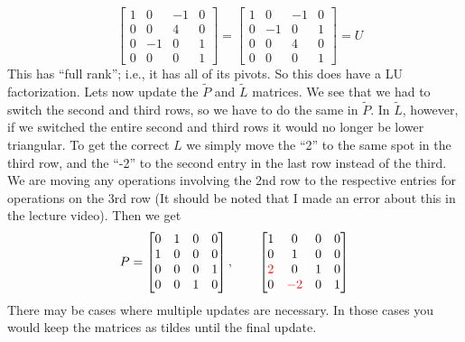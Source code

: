 \documentclass[reqno]{amsart}
\theoremstyle{definition}
\begin{document}
\begin{itemize}
\begin{equation*}
\begin{matrix}
\end{matrix}
\begin{bmatrix}
1 & 0 & -1 & 0\\
0 & 0 & 4 & 0\\
0 & -1 & 0 & 1\\
0 & 0 & 0 & 1
\end{bmatrix} = \begin{bmatrix}
1 & 0 & -1 & 0\\
0 & -1 & 0 & 1\\
0 & 0 & 4 & 0\\
0 & 0 & 0 & 1
\end{bmatrix} = U
\end{equation*}
%
This has ``full rank''; i.e., it has all of its pivots.  So this does have a LU factorization.  Lets now update the $\tilde{P}$ and $\tilde{L}$ matrices.  We see that we had to switch the second and third rows, so we have to do the same in $\tilde{P}$.  In $\tilde{L}$, however, if we switched the entire second and third rows it would no longer be lower triangular.  To get the correct $L$ we simply move the ``2'' to the same spot in the third row, and the ``-2'' to the second entry in the last row instead of the third.  We are moving any operations involving the 2nd row to the respective entries for operations on the 3rd row ({\color{red}It should be noted that I made an error about this in the lecture video}).  Then we get
%
\begin{equation*}
P = \begin{bmatrix}
0 & 1 & 0 & 0\\
1 & 0 & 0 & 0\\
0 & 0 & 0 & 1\\
0 & 0 & 1 & 0
\end{bmatrix},\qquad \begin{bmatrix}
1 & 0 & 0 & 0\\
0 & 1 & 0 & 0\\
{\color{red}2} & 0 & 1 & 0\\
0 & {\color{red}-2} & 0 & 1
\end{bmatrix}
\end{equation*}
%
There may be cases where multiple updates are necessary.  In those cases you would keep the matrices as tildes until the final update.

\end{itemize}
\end{document}

